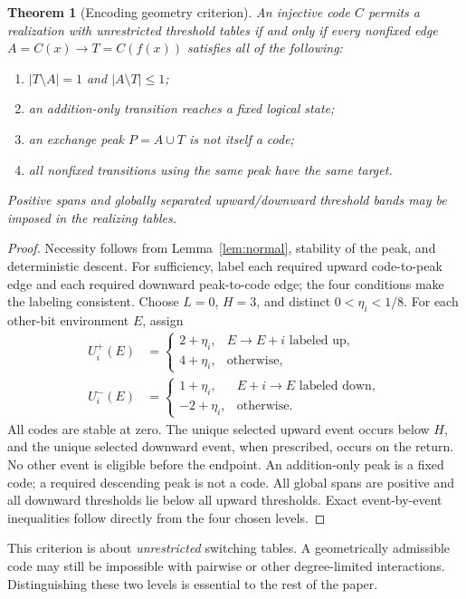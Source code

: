 \documentclass[12pt,letterpaper]{article}
\newtheorem{theorem}{Theorem}[section]
\theoremstyle{definition}\newtheorem{definition}[theorem]{Definition}
\theoremstyle{remark}\newtheorem{remark}[theorem]{Remark}
\begin{document}
\begin{theorem}[Encoding geometry criterion]\label{thm:criterion}
An injective code $C$ permits a realization with unrestricted threshold tables if and only if every nonfixed edge $A=C(x)\to T=C(f(x))$ satisfies all of the following:
\begin{enumerate}
\item $|T\setminus A|=1$ and $|A\setminus T|\le1$;
\item an addition-only transition reaches a fixed logical state;
\item an exchange peak $P=A\cup T$ is not itself a code;
\item all nonfixed transitions using the same peak have the same target.
\end{enumerate}
Positive spans and globally separated upward/downward threshold bands may be imposed in the realizing tables.
\end{theorem}
\begin{proof}
Necessity follows from Lemma~\ref{lem:normal}, stability of the peak, and deterministic descent. For sufficiency, label each required upward code-to-peak edge and each required downward peak-to-code edge; the four conditions make the labeling consistent. Choose $L=0$, $H=3$, and distinct $0<\eta_i<1/8$. For each other-bit environment $E$, assign
\begin{align}\label{eq:tableconstruction}
U_i^+(E)&=\begin{cases}2+\eta_i,&E\to E+i\text{ labeled up},\\4+\eta_i,&\text{otherwise},\end{cases}\\
U_i^-(E)&=\begin{cases}1+\eta_i,&E+i\to E\text{ labeled down},\\-2+\eta_i,&\text{otherwise}.\end{cases}\nonumber
\end{align}
All codes are stable at zero. The unique selected upward event occurs below $H$, and the unique selected downward event, when prescribed, occurs on the return. No other event is eligible before the endpoint. An addition-only peak is a fixed code; a required descending peak is not a code. All global spans are positive and all downward thresholds lie below all upward thresholds. Exact event-by-event inequalities follow directly from the four chosen levels.
\end{proof}

This criterion is about \emph{unrestricted} switching tables. A geometrically admissible code may still be impossible with pairwise or other degree-limited interactions. Distinguishing these two levels is essential to the rest of the paper.
\end{document}
